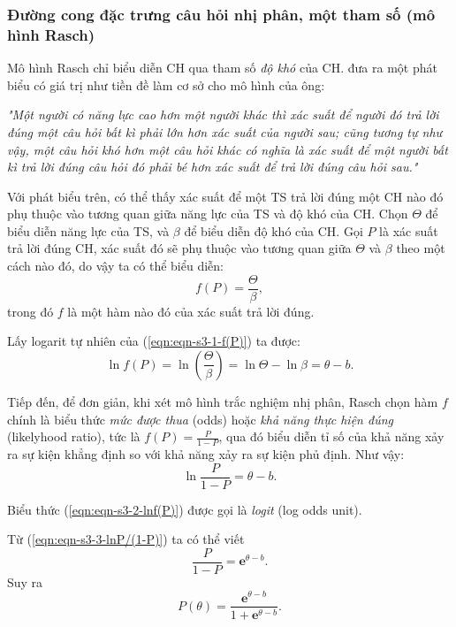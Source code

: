 \subsubsection{Đường cong đặc trưng câu hỏi nhị phân, một tham số (mô hình Rasch)}
Mô hình Rasch chỉ biểu diễn CH qua tham số \textit{độ khó} của CH. \textcite{rasch1993probabilistic} đưa ra một phát biểu có giá trị như tiền đề làm cơ sở cho mô hình của ông:\par
{\raggedleft\textit{"Một người có năng lực cao hơn một người khác thì xác suất để người đó trả lời đúng một câu hỏi bất kì phải lớn hơn xác suất của người sau; cũng tương tự như vậy, một câu hỏi khó hơn một câu hỏi khác có nghĩa là xác suất để một người bất kì trả lời đúng câu hỏi đó phải bé hơn xác suất để trả lời đúng câu hỏi sau."}\par}
Với phát biểu trên, có thể thấy xác suất để một TS trả lời đúng một CH nào đó phụ thuộc vào tương quan giữa năng lực của TS và độ khó của CH. Chọn $\Theta$ để biểu diễn năng lực của TS, và $\beta$ để biểu diễn độ khó của CH. Gọi $P$ là xác suất trả lời đúng CH, xác suất đó sẽ phụ thuộc vào tương quan giữa $\Theta$ và $\beta$ theo một cách nào đó, do vậy ta có thể biểu diễn:
\begin{equation}\label{eqn:eqn-s3-1-f(P)}
	f(P)=\frac{\Theta}{\beta},
\end{equation}
trong đó $f$ là một hàm nào đó của xác suất trả lời đúng.\par
Lấy logarit tự nhiên của (\ref{eqn:eqn-s3-1-f(P)}) ta được:
\begin{equation}\label{eqn:eqn-s3-2-lnf(P)}
	\ln f(P)=\ln\left(\frac{\Theta}{\beta}\right)=\ln\Theta-\ln\beta=\theta-b.
\end{equation}\par
Tiếp đến, để đơn giản, khi xét mô hình trắc nghiệm nhị phân, Rasch chọn hàm $f$ chính là biểu thức \textit{mức được thua} (odds) hoặc \textit{khả năng thực hiện đúng} (likelyhood ratio), tức là $f(P)=\frac{P}{1-P}$, qua đó biểu diễn tỉ số của khả năng xảy ra sự kiện khẳng định so với khả năng xảy ra sự kiện phủ định. Như vậy:
\begin{equation}\label{eqn:eqn-s3-3-lnP/(1-P)}
	\ln\frac{P}{1-P}=\theta-b.
\end{equation}\par
Biểu thức (\ref{eqn:eqn-s3-2-lnf(P)}) được gọi là \textit{logit} (log odds unit).\par
Từ (\ref{eqn:eqn-s3-3-lnP/(1-P)}) ta có thể viết $$\frac{P}{1-P}=\mathbf{e}^{\theta-b}.$$
Suy ra
\begin{equation}\label{eqn:eqn-s3-4-P(theta)}
	P(\theta)=\frac{\mathbf{e}^{\theta-b}}{1+\mathbf{e}^{\theta-b}}.
\end{equation}\par
